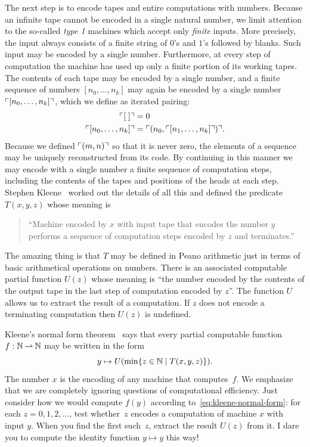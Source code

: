 The next step is to encode tapes and entire computations with numbers.
Because an infinite tape cannot be encoded in a single natural number,
we limit attention to the so-called \emph{type 1} machines which
accept only \emph{finite} inputs. More precisely, the input always
consists of a finite string of $0$'s and $1$'s followed by blanks.
Such input may be encoded by a single number. Furthermore, at every
step of computation the machine has used up only a finite portion of
its working tapes. The contents of each tape may be encoded by a
single number, and a finite sequence of numbers $[n_0, \ldots, n_k]$
may again be encoded by a single number $\ulcorner [n_0, \ldots, n_k] \urcorner$,
which we define as iterated pairing:
%
\begin{align*}
  \ulcorner [\;] \urcorner &= 0 \\
  \ulcorner [n_0, \ldots, n_k] \urcorner &= \ulcorner (n_0, \ulcorner [n_1, \ldots, n_k] \urcorner) \urcorner.
\end{align*}
%
Because we defined $\ulcorner (m,n) \urcorner$ so that it is never zero, the
elements of a sequence may be uniquely reconstructed from its code. By
continuing in this manner we may encode with a single number a finite
sequence of computation steps, including the contents of the tapes
and positions of the heads at each step. Stephen Kleene~\cite{kleene43:_recur_predic_and_quant}
worked out the details of all this and defined the predicate
$T(x,y,z)$ whose meaning is
%
\begin{quote}
  ``Machine encoded by $x$ with input tape that encodes the number $y$
  performs a sequence of computation steps encoded by $z$ and
  terminates.''
\end{quote}
%
The amazing thing is that $T$ may be defined in Peano arithmetic just
in terms of basic arithmetical operations on numbers. There is an
associated computable partial function $U(z)$ whose meaning is ``the
number encoded by the contents of the output tape in the last step of
computation encoded by $z$''. The function $U$ allows us to extract
the result of a computation. If $z$ does not encode a terminating
computation then $U(z)$ is undefined.

Kleene's normal form theorem~\cite{kleene43:_recur_predic_and_quant}
says that every partial computable function $f : \mathbb{N} \mathbin{\rightharpoonup} \mathbb{N}$ may
be written in the form
%
\begin{equation}
  \label{eq:kleene-normal-form}
  y \mapsto U(\min \{z \in \mathbb{N} \mid T(x,y,z)\}).
\end{equation}
%
The number $x$ is the encoding of any machine that computes~$f$. We
emphasize that we are completely ignoring questions of computational
efficiency. Just consider how we would compute $f(y)$ according
to~\eqref{eq:kleene-normal-form}: for each $z = 0, 1, 2, \ldots$, test
whether~$z$ encodes a computation of machine $x$ with input $y$. When
you find the first such~$z$, extract the result $U(z)$ from it. I dare
you to compute the identity function $y \mapsto y$ this way!

